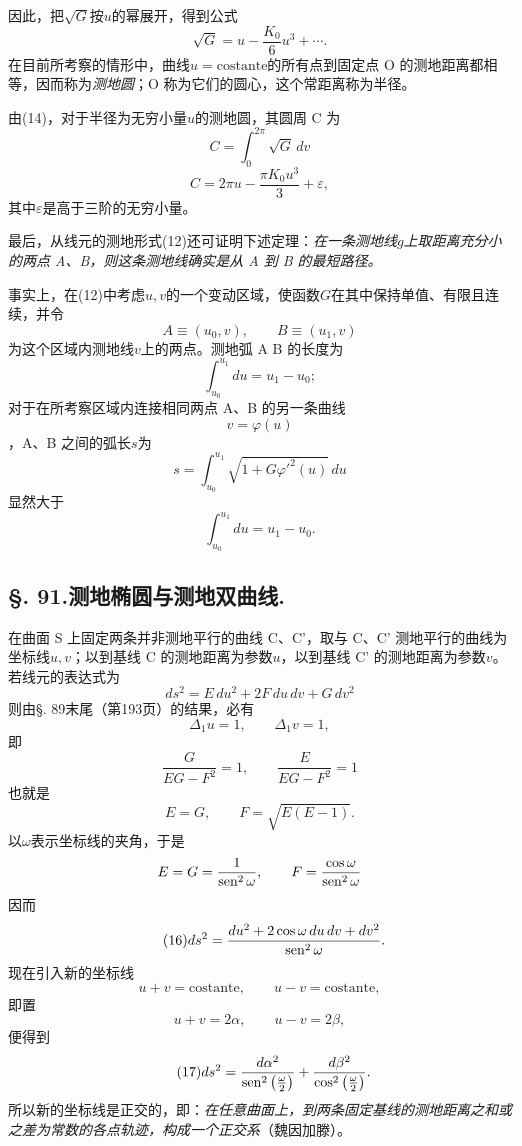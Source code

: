 因此，把\(\sqrt G\)按\(u\)的幂展开，得到公式
\begin{equation}\tag{14}
 \sqrt G=u-\frac{K_0}{6}u^3+\cdots.
\end{equation}
在目前所考察的情形中，曲线\(u=\mathrm{costante}\)的所有点到固定点 O 的测地距离都相等，因而称为\emph{测地圆}；O 称为它们的圆心，这个常距离称为半径。

由(14)，对于半径为无穷小量\(u\)的测地圆，其圆周 C 为
\[
 C=\int_0^{2\pi}\sqrt G\,dv
\]
\begin{equation}\tag{15}
 C=2\pi u-\frac{\pi K_0u^3}{3}+\varepsilon,
\end{equation}
其中\(\varepsilon\)是高于三阶的无穷小量。

最后，从线元的测地形式(12)还可证明下述定理：\emph{在一条测地线\(g\)上取距离充分小的两点 A、B，则这条测地线确实是从 A 到 B 的最短路径。}

事实上，在(12)中考虑\(u,v\)的一个变动区域，使函数\(G\)在其中保持单值、有限且连续，并令
\[
 A\equiv(u_0,v),\qquad B\equiv(u_1,v)
\]
为这个区域内测地线\(v\)上的两点。测地弧 A B 的长度为
\[
 \int_{u_0}^{u_1}du=u_1-u_0;
\]
对于在所考察区域内连接相同两点 A、B 的另一条曲线
\[
 v=\varphi(u)
\]
，A、B 之间的弧长\(s\)为
\[
 s=\int_{u_0}^{u_1}\sqrt{1+G\varphi'^2(u)}\,du
\]
显然大于
\[
 \int_{u_0}^{u_1}du=u_1-u_0.
\]

\subsection*{\S. 91.\quad 测地椭圆与测地双曲线.}

在曲面 S 上固定两条并非测地平行的曲线 C、C'，取与 C、C' 测地平行的曲线为坐标线\(u,v\)；以到基线 C 的测地距离为参数\(u\)，以到基线 C' 的测地距离为参数\(v\)。若线元的表达式为
\[
 ds^2=E\,du^2+2F\,du\,dv+G\,dv^2
\]
则由\S. 89末尾（第193页）的结果，必有
\[
 \Delta_1u=1,
 \qquad
 \Delta_1v=1,
\]
即
\[
 \frac{G}{EG-F^2}=1,
 \qquad
 \frac{E}{EG-F^2}=1
\]
也就是
\[
 E=G,
 \qquad
 F=\sqrt{E(E-1)}.
\]
以\(\omega\)表示坐标线的夹角，于是
\[
 E=G=\frac1{\operatorname{sen}^2\omega},
 \qquad
 F=\frac{\cos\omega}{\operatorname{sen}^2\omega}
\]
因而
\begin{equation}\tag{16}
 ds^2=\frac{du^2+2\cos\omega\,du\,dv+dv^2}{\operatorname{sen}^2\omega}.
\end{equation}
现在引入新的坐标线
\[
 u+v=\mathrm{costante},
 \qquad
 u-v=\mathrm{costante},
\]
即置
\[
 u+v=2\alpha,
 \qquad
 u-v=2\beta,
\]
便得到
\begin{equation}\tag{17}
 ds^2=\frac{d\alpha^2}{\operatorname{sen}^2\left(\frac\omega2\right)}+\frac{d\beta^2}{\cos^2\left(\frac\omega2\right)}.
\end{equation}
所以新的坐标线是正交的，即：\emph{在任意曲面上，到两条固定基线的测地距离之和或之差为常数的各点轨迹，构成一个正交系}（魏因加滕）。

